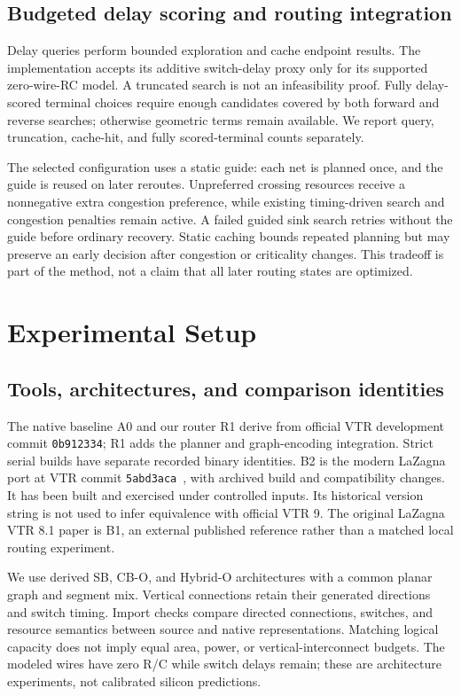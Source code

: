 \documentclass[conference,10pt]{IEEEtran}
\begin{document}
\subsection{Budgeted delay scoring and routing integration}
Delay queries perform bounded exploration and cache endpoint results. The implementation accepts its additive switch-delay proxy only for its supported zero-wire-RC model. A truncated search is not an infeasibility proof. Fully delay-scored terminal choices require enough candidates covered by both forward and reverse searches; otherwise geometric terms remain available. We report query, truncation, cache-hit, and fully scored-terminal counts separately.

The selected configuration uses a static guide: each net is planned once, and the guide is reused on later reroutes. Unpreferred crossing resources receive a nonnegative extra congestion preference, while existing timing-driven search and congestion penalties remain active. A failed guided sink search retries without the guide before ordinary recovery. Static caching bounds repeated planning but may preserve an early decision after congestion or criticality changes. This tradeoff is part of the method, not a claim that all later routing states are optimized.

\clearpage
\section{Experimental Setup}
\subsection{Tools, architectures, and comparison identities}
The native baseline A0 and our router R1 derive from official VTR development commit \texttt{0b912334}; R1 adds the planner and graph-encoding integration. Strict serial builds have separate recorded binary identities. B2 is the modern LaZagna port at VTR commit \texttt{5abd3aca}~\cite{modern}, with archived build and compatibility changes. It has been built and exercised under controlled inputs. Its historical version string is not used to infer equivalence with official VTR 9. The original LaZagna VTR 8.1 paper is B1, an external published reference rather than a matched local routing experiment.

We use derived SB, CB-O, and Hybrid-O architectures with a common planar graph and segment mix. Vertical connections retain their generated directions and switch timing. Import checks compare directed connections, switches, and resource semantics between source and native representations. Matching logical capacity does not imply equal area, power, or vertical-interconnect budgets. The modeled wires have zero R/C while switch delays remain; these are architecture experiments, not calibrated silicon predictions.
\end{document}
